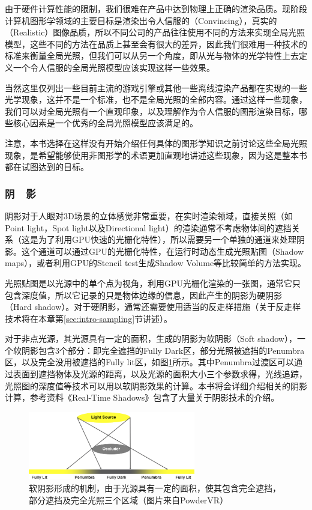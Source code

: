 由于硬件计算性能的限制，我们很难在产品中达到物理上正确的渲染品质。现阶段计算机图形学领域的主要目标是渲染出令人信服的（Convincing），真实的（Realistic）图像品质，所以不同公司的产品往往使用不同的方法来实现全局光照模型，这些不同的方法在品质上甚至会有很大的差异，因此我们很难用一种技术的标准来衡量全局光照，但我们可以从另一个角度，即从光与物体的光学特性上去定义一个令人信服的全局光照模型应该实现这样一些效果。

当然这里仅列出一些目前主流的游戏引擎或其他一些离线渲染产品都在实现的一些光学现象，这并不是一个标准，也不是全局光照的全部内容。通过这样一些现象，我们可以对全局光照有一个直观印象，以及理解作为令人信服的图形渲染目标，哪些核心因素是一个优秀的全局光照模型应该满足的。

注意，本书选择在这样没有开始介绍任何具体的图形学知识之前讨论这些全局光照现象，是希望能够使用非图形学的术语更加直观地讲述这些现象，因为这是整本书都在试图达到的目标。



\subsubsection{阴~~影}
阴影对于人眼对3D场景的立体感觉非常重要，在实时渲染领域，直接关照（如Point light，Spot light以及Directional light）的渲染通常不考虑物体间的遮挡关系（这是为了利用GPU快速的光栅化特性），所以需要另一个单独的通道来处理阴影。这个通道可以通过GPU的光栅化特性，在运行时动态生成光照贴图（Shadow maps），或者利用GPU的Stencil test生成Shadow Volume等比较简单的方法实现。

光照贴图是以光源中的单个点为视角，利用GPU光栅化渲染的一张图，通常它只包含深度值，所以它记录的只是物体边缘的信息，因此产生的阴影为硬阴影（Hard shadow）。对于硬阴影，通常还需要使用适当的反走样措施（关于反走样技术将在本章第\ref{sec:intro-sampling}节讲述）。

对于非点光源，其光源具有一定的面积，生成的阴影为软阴影（Soft shadow），一个软阴影包含3个部分：即完全遮挡的Fully Dark区，部分光照被遮挡的Penumbra区，以及完全没用被遮挡的Fully lit区，如图\ref{f:intro-shadow}所示。其中Penumbra过渡区可以通过表面到遮挡物体及光源的距离，以及光源的面积大小三个参数求得，光线追踪，光照图的深度值等技术可以用以软阴影效果的计算。本书将会详细介绍相关的阴影计算，参考资料《Real-Time Shadows》\cite{b:rts}包含了大量关于阴影技术的介绍。

\begin{figure}
\sidecaption
	\includegraphics[width=0.65\textwidth]{figures/intro/shadow}
	\caption{软阴影形成的机制，由于光源具有一定的面积，使其包含完全遮挡，部分遮挡及完全光照三个区域（图片来自PowderVR）}
	\label{f:intro-shadow}
\end{figure}




